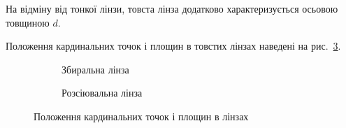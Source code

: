 На відміну від тонкої лінзи, товста лінза додатково характеризується осьовою товщиною $d$.

Положення кардинальних точок і площин в товстих лінзах наведені на рис.~\ref{pic:Lens}.

\begin{figure}[h!]\centering
	\begin{subfigure}{\linewidth}\centering
		
		\caption{Збиральна лінза}
		\label{pic:Lens_convex}
	\end{subfigure}
	\begin{subfigure}{\linewidth}\centering
		
		\caption{Розсіювальна лінза}
		\label{pic:Lens_concave}
	\end{subfigure}
	\caption{Положення кардинальних точок і площин в лінзах}
	\label{pic:Lens}
\end{figure}




